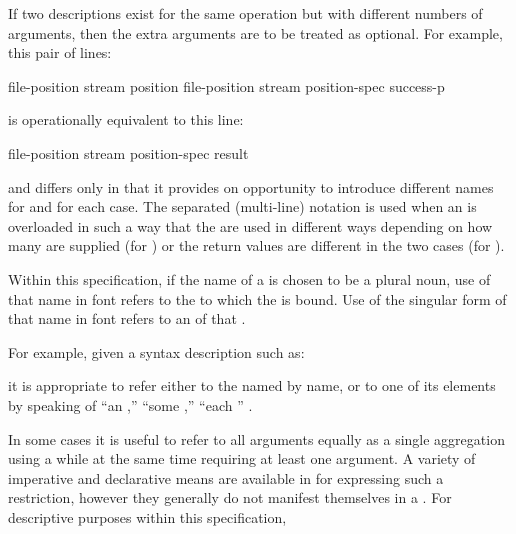 
If two descriptions exist for the same operation but with different numbers of
arguments, then the extra arguments are to be treated as optional.  For example,
this pair of lines:

\DefunWithValues file-position {stream} {position}
\DefunWithValues file-position {stream position-spec} {success-p}

\noindent is operationally equivalent to this line:

\DefunWithValues file-position {stream {\opt} position-spec} {result}

\noindent and differs only in that it provides on opportunity to introduce different
names for  and  for each case.
The separated (multi-line) notation is used when an  is overloaded in
such a way that the  are used in different ways
depending on how many  are supplied (\eg for \thefunction{/})
or the return values are different in the two cases (\eg for ).

\endsubsubsubsection%


Within this specification, 
if the name of a  is chosen to be a plural noun,
use of that name in  font refers
to the  to which the  is bound.
Use of the singular form of that name in  font refers 
to an  of that .

For example, given a syntax description such as:

 {{\rest} }

\noindent it is appropriate to refer either to the  named
 by name, or to one of its elements by speaking of ``an ,''
``some ,'' ``each '' \etc.

\endsubsubsubsection%


In some cases it is useful to refer to all arguments equally as a single
aggregation using a  while at the same time
requiring at least one argument.  A variety of imperative and
declarative means are available in  for expressing such a
restriction, however they generally do not manifest themselves in a
.  For descriptive purposes within this specification,

